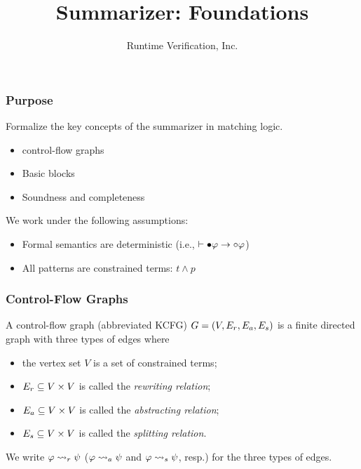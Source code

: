 \documentclass{beamer}
\title{\K Summarizer: Foundations}
\author{Runtime Verification, Inc.}
\begin{document}
\frame{\titlepage}

\begin{frame}
\frametitle{Purpose}
Formalize the key concepts of the \K summarizer in matching logic.
\begin{itemize}
\item \K control-flow graphs
\item Basic blocks
\item Soundness and completeness
\end{itemize}
We work under the following assumptions:
\begin{itemize}
\item Formal semantics are deterministic
  (i.e., $\vdash \mathord{\bullet} \varphi \rightarrow \mathord{\circ} \varphi$)
\item All patterns are constrained terms: $t \land p$
\end{itemize}
\end{frame}

\begin{frame}
\frametitle{\K Control-Flow Graphs}
\begin{definition}
A \K control-flow graph (abbreviated KCFG) $G = (V, E_r, E_a, E_s)$ is a finite directed graph
with three types of edges where
\begin{itemize}
\item the vertex set $V$ is a set of constrained terms;
\item $E_r \subseteq V \times V$ is called the \emph{rewriting relation};
\item $E_a \subseteq V \times V$ is called the \emph{abstracting relation};
\item $E_s \subseteq V \times V$ is called the \emph{splitting relation}. 
\end{itemize}
We write $\varphi \rightsquigarrow_r \psi$ 
($\varphi \rightsquigarrow_a \psi$ and $\varphi \rightsquigarrow_s \psi$, resp.)
for the three types of edges.
\end{definition}
\end{frame}
\end{document}
